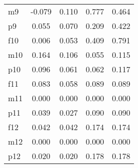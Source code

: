 \begin{table}[htbp]
\begin{tabular}{lcccc}
m9 &    -0.079 &     0.110 &     0.777 &     0.464 \\  
p9 &     0.055 &     0.070 &     0.209 &     0.422 \\  
f10 &     0.006 &     0.053 &     0.409 &     0.791 \\  
m10 &     0.164 &     0.106 &     0.055 &     0.115 \\  
p10 &     0.096 &     0.061 &     0.062 &     0.117 \\  
f11 &     0.083 &     0.058 &     0.089 &     0.089 \\  
m11 &     0.000 &     0.000 &     0.000 &     0.000 \\  
p11 &     0.039 &     0.027 &     0.090 &     0.090 \\  
f12 &     0.042 &     0.042 &     0.174 &     0.174 \\  
m12 &     0.000 &     0.000 &     0.000 &     0.000 \\  
p12 &     0.020 &     0.020 &     0.178 &     0.178 \\  
\hline \hline \end{tabular}
\end{table}
